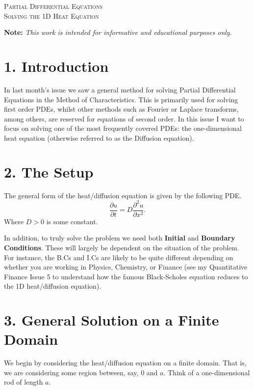 \documentclass[11pt]{article}
\begin{document}

\begin{tcolorbox}
\begin{center}
    \large
    \textsc{Partial Differential Equations \\ Solving the 1D Heat Equation}
\end{center}
\end{tcolorbox}

\begin{center}
\textbf{Note:} \textit{This work is intended for informative and educational purposes only.}
\end{center}

\section*{1. Introduction}
In last month's issue we saw a general method for solving Partial Differential Equations in the Method of Characteristics. This is primarily used for solving first order PDEs, whilst other methods such as Fourier or Laplace transforms, among others, are reserved for equations of second order. In this issue I want to focus on solving one of the most frequently covered PDEs: the one-dimensional heat equation (otherwise referred to as the Diffusion equation). 

\section*{2. The Setup}
The general form of the heat/diffusion equation is given by the following PDE.
\begin{equation}
    \frac{\partial u}{\partial t} = D \frac{\partial^2 u}{\partial x^2}.
\end{equation}
Where $D>0$ is some constant. 

In addition, to truly solve the problem we need both \textbf{Initial} and \textbf{Boundary Conditions}. These will largely be dependent on the situation of the problem. For instance, the B.Cs and I.Cs are likely to be quite different depending on whether you are working in Physics, Chemistry, or Finance (see my Quantitative Finance Issue 5 to understand how the famous Black-Scholes equation reduces to the 1D heat/diffusion equation). 

\section*{3. General Solution on a Finite Domain}
We begin by considering the heat/diffusion equation on a finite domain. That is, we are considering some region between, say, 0 and $a$. Think of a one-dimensional rod of length $a$.
\end{document}
